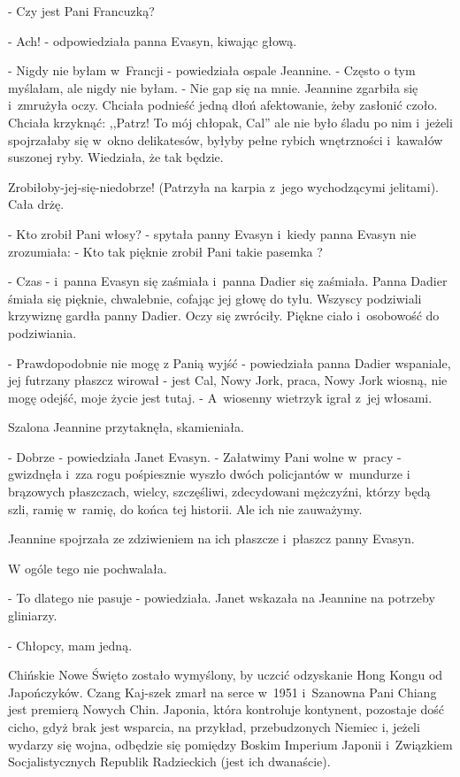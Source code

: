 \documentclass[oneside,polish,12pt,sfheadings]{mwbk}
\begin{document}
- Czy jest Pani Francuzką?

- Ach! - odpowiedziała panna Evasyn, kiwając głową.

- Nigdy nie byłam w~Francji - powiedziała ospale Jeannine. - Często
o tym myślałam, ale nigdy nie byłam. - Nie gap się na mnie. Jeannine
zgarbiła się i~zmrużyła oczy. Chciała podnieść jedną dłoń afektowanie,
żeby zasłonić czoło. Chciała krzyknąć: ,,Patrz! To mój chłopak, Cal'' ale nie było śladu po nim i~jeżeli spojrzałaby się w~okno delikatesów,
byłyby pełne rybich wnętrzności i~kawałów suszonej ryby. Wiedziała,
że tak będzie.

Zrobiłoby-jej-się-niedobrze! (Patrzyła na karpia z~jego wychodzącymi
jelitami). Cała drżę.

- Kto zrobił Pani włosy? - spytała panny Evasyn i~kiedy panna Evasyn
nie zrozumiała: - Kto tak pięknie zrobił Pani takie pasemka ?

- Czas - i~panna Evasyn się zaśmiała i~panna Dadier się zaśmiała.
Panna Dadier śmiała się pięknie, chwalebnie, cofając jej głowę do
tyłu. Wszyscy podziwiali krzywiznę gardła panny Dadier. Oczy się zwróciły.
Piękne ciało i~osobowość do podziwiania. 

- Prawdopodobnie nie mogę
z Panią wyjść - powiedziała panna Dadier wspaniale, jej futrzany płaszcz
wirował - jest Cal, Nowy Jork, praca, Nowy Jork wiosną, nie mogę odejść,
moje życie jest tutaj. - A~wiosenny wietrzyk igrał z~jej włosami.

Szalona Jeannine przytaknęła, skamieniała.

- Dobrze - powiedziała Janet Evasyn. - Załatwimy Pani wolne w~pracy
- gwizdnęła i~zza rogu pośpiesznie wyszło dwóch policjantów w~mundurze
i brązowych płaszczach, wielcy, szczęśliwi, zdecydowani mężczyźni,
którzy będą szli, ramię w~ramię, do końca tej historii. Ale ich nie
zauważymy.

Jeannine spojrzała ze zdziwieniem na ich płaszcze i~płaszcz panny
Evasyn.

W ogóle tego nie pochwalała.

- To dlatego nie pasuje - powiedziała. Janet wskazała na Jeannine
na potrzeby gliniarzy.

- Chłopcy, mam jedną.

Chińskie Nowe Święto zostało wymyślony, by uczcić odzyskanie Hong
Kongu od Japończyków. Czang Kaj-szek zmarł na serce w~1951 i~Szanowna
Pani Chiang jest premierą Nowych Chin. Japonia, która kontroluje kontynent,
pozostaje dość cicho, gdyż brak jest wsparcia, na przykład, przebudzonych
Niemiec i, jeżeli wydarzy się wojna, odbędzie się pomiędzy Boskim
Imperium Japonii i~Związkiem Socjalistycznych Republik Radzieckich
(jest ich dwanaście).
\end{document}
